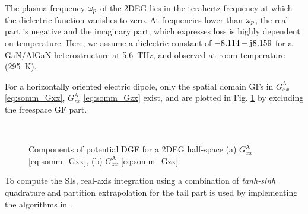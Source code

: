 \documentclass[12pt]{article}
\begin{document}
The plasma frequency $\omega_p$ of the 2DEG lies in the terahertz frequency at which the dielectric function vanishes to zero. At frequencies lower than $\omega_p$, the real part is negative and the imaginary part, which expresses loss is highly dependent on temperature. Here, we assume a dielectric constant of $ -8.114 - \mathrm{j}\mkern1mu 8.159$ for a GaN/AlGaN heterostructure at \SI{5.6}{\THz}, and observed at room temperature (\SI{295}{\kelvin}).

For a horizontally oriented electric dipole, only the spatial domain GFs in $G_{xx}^\mathrm{A}$ \eqref{eq:somm_Gxx}, $G_{zx}^\mathrm{A}$ \eqref{eq:somm_Gzx} exist, and are plotted in Fig. \ref{fig:G^A_components_halfspace} by excluding the freespace GF part.
%
\begin{figure}[!htbp]
  \centering
  \\
  \caption{Components of potential DGF for a 2DEG half-space (a) $G_{xx}^\mathrm{A}$ \eqref{eq:somm_Gxx}, (b) $G_{zx}^\mathrm{A}$ \eqref{eq:somm_Gzx} }
  \label{fig:G^A_components_halfspace}
\end{figure}
To compute the SIs, real-axis integration using a combination of \emph{tanh-sinh} quadrature \cite{Koufogiannis2015,bbbbbbbbbbbb} and partition extrapolation \cite{Michalski1998} for the tail part is used by implementing the algorithms in \cite{Michalski2016}.
\end{document}
